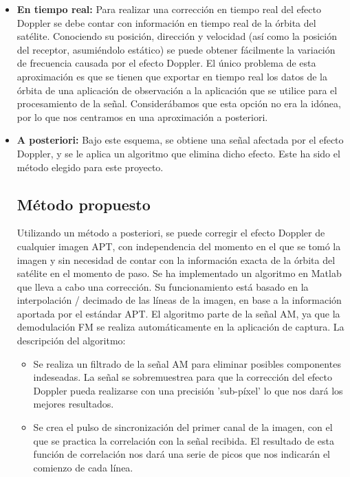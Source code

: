 \documentclass[a4paper,openright,12pt]{article}
\begin{document}
	\begin{itemize}
	
	\item \textbf{En tiempo real:} Para realizar una corrección en tiempo real del efecto Doppler se debe contar con información en tiempo real de la órbita del satélite. Conociendo su posición, dirección y velocidad (así como la posición del receptor, asumiéndolo estático) se puede obtener fácilmente la variación de frecuencia causada por el efecto Doppler. El único problema de esta aproximación es que se tienen que exportar en tiempo real los datos de la órbita de una aplicación de observación a la aplicación que se utilice para el procesamiento de la señal. Considerábamos que esta opción no era la idónea, por lo que nos centramos en una aproximación a posteriori.
	
	\item \textbf{A posteriori:} Bajo este esquema, se obtiene una señal afectada por el efecto Doppler, y se le aplica un algoritmo que elimina dicho efecto. Este ha sido el método elegido para este proyecto.
	
	\subsection{Método propuesto} 
	
	Utilizando un método a posteriori, se puede corregir el efecto Doppler de cualquier imagen APT, con independencia del momento en el que se tomó la imagen y sin necesidad de contar con la información exacta de la órbita del satélite en el momento de paso. Se ha implementado un algoritmo en Matlab que lleva a cabo una corrección. Su funcionamiento está basado en la interpolación / decimado de las líneas de la imagen, en base a la información aportada por el estándar APT. El algoritmo parte de la señal AM, ya que la demodulación FM se realiza automáticamente en la aplicación de captura. La descripción del algoritmo:

\begin{itemize}

	\item Se realiza un filtrado de la señal AM para eliminar posibles componentes indeseadas. La señal se sobremuestrea para que la corrección del efecto Doppler pueda realizarse con una precisión 'sub-píxel' lo que nos dará los mejores resultados.
	
	\item Se crea el pulso de sincronización del primer canal de la imagen, con el que se practica la correlación con la señal recibida. El resultado de esta función de correlación nos dará una serie de picos que nos indicarán el comienzo de cada línea.
	

\end{itemize}
\end{itemize}
\end{document}
